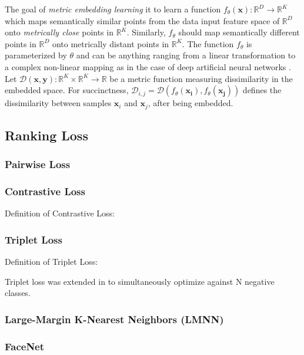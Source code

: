 The goal of \textit{metric embedding learning} it to learn a function $f_{\theta}(\bm{x}):\mathbb{R}^{D} \rightarrow \mathbb{R}^{K}$ which maps semantically similar points from the data input feature space of $\mathbb{R}^{D}$ onto \textit{metrically close} points in $\mathbb{R}^{K}$.  Similarly, $f_{\theta}$ should map semantically different points in $\mathbb{R}^{D}$ onto metrically distant points in $\mathbb{R}^{K}$.  The function $f_{\theta}$ is parameterized by $\theta$ and can be anything ranging from a linear transformation to a complex non-linear mapping as in the case of deep artificial neural networks \cite{Hermans2017DefenseTripletLoss}.  Let $\mathcal{D}(\bm{x},\bm{y}): \mathbb{R}^{K} \times \mathbb{R}^{K} \rightarrow \mathbb{R}$ be a metric function measuring dissimilarity in the embedded space.  For succinctness, $\mathcal{D}_{i,j} = \mathcal{D}(f_{\theta}(\bm{x_{i}}),f_{\theta}(\bm{x_{j}}))$
defines the dissimilarity between samples $\bm{x}_{i}$ and $\bm{x}_{j}$, after being embedded.

	\subsection{Ranking Loss}
	
	\subsubsection{Pairwise Loss}
	
	\subsubsection{Contrastive Loss}
	Definition of Contrastive Loss:
	
	
	\subsubsection{Triplet Loss}
	
	Definition of Triplet Loss:
	
	Triplet loss was extended in \cite{Sohn2016NPairLoss} to simultaneously optimize against N negative classes.

		\subsubsection{Large-Margin K-Nearest Neighbors (LMNN)}
		
		\subsubsection{FaceNet}
		
